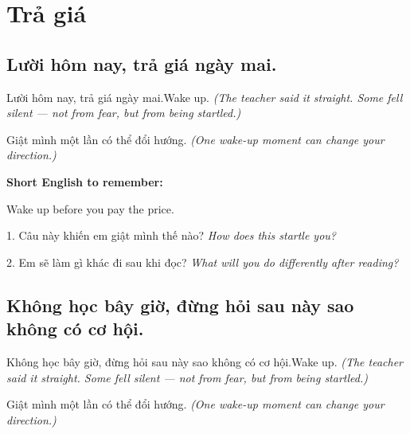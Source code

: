 \chapter{Trả giá}


\section{Lười hôm nay, trả giá ngày mai.}
\begin{truyen}{Lười hôm nay, trả giá ngày mai.}{Wake up.}
\textit{(The teacher said it straight. Some fell silent — not from fear, but from being startled.)}
\end{truyen}

\begin{baihoc}
Giật mình một lần có thể đổi hướng.
\textit{(One wake-up moment can change your direction.)}
\end{baihoc}

\begin{ghinhoanh}
\textbf{Short English to remember:}

Wake up before you pay the price.

\end{ghinhoanh}

\begin{tuhocnhanh}
1. Câu này khiến em giật mình thế nào? \textit{How does this startle you?}

2. Em sẽ làm gì khác đi sau khi đọc? \textit{What will you do differently after reading?}
\end{tuhocnhanh}
\ngancach


\section{Không học bây giờ, đừng hỏi sau này sao không có cơ hội.}
\begin{truyen}{Không học bây giờ, đừng hỏi sau này sao không có cơ hội.}{Wake up.}
\textit{(The teacher said it straight. Some fell silent — not from fear, but from being startled.)}
\end{truyen}

\begin{baihoc}
Giật mình một lần có thể đổi hướng.
\textit{(One wake-up moment can change your direction.)}
\end{baihoc}

